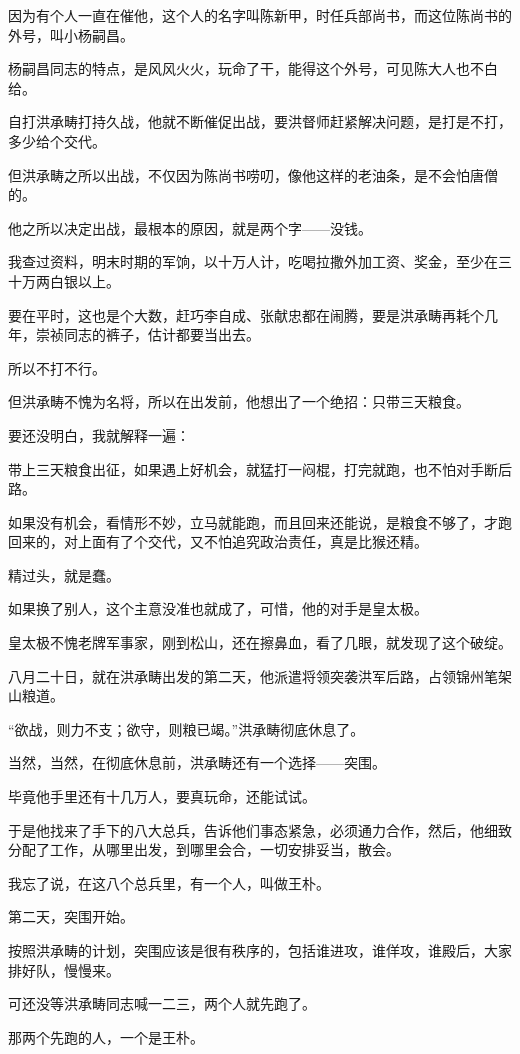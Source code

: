 \begin{multicols}{\theparacolNo}
因为有个人一直在催他，这个人的名字叫陈新甲，时任兵部尚书，而这位陈尚书的外号，叫小杨嗣昌。

杨嗣昌同志的特点，是风风火火，玩命了干，能得这个外号，可见陈大人也不白给。

自打洪承畴打持久战，他就不断催促出战，要洪督师赶紧解决问题，是打是不打，多少给个交代。

但洪承畴之所以出战，不仅因为陈尚书唠叨，像他这样的老油条，是不会怕唐僧的。

他之所以决定出战，最根本的原因，就是两个字——没钱。

我查过资料，明末时期的军饷，以十万人计，吃喝拉撒外加工资、奖金，至少在三十万两白银以上。

要在平时，这也是个大数，赶巧李自成、张献忠都在闹腾，要是洪承畴再耗个几年，崇祯同志的裤子，估计都要当出去。

所以不打不行。

但洪承畴不愧为名将，所以在出发前，他想出了一个绝招：只带三天粮食。

要还没明白，我就解释一遍：

带上三天粮食出征，如果遇上好机会，就猛打一闷棍，打完就跑，也不怕对手断后路。

如果没有机会，看情形不妙，立马就能跑，而且回来还能说，是粮食不够了，才跑回来的，对上面有了个交代，又不怕追究政治责任，真是比猴还精。

精过头，就是蠢。

如果换了别人，这个主意没准也就成了，可惜，他的对手是皇太极。

皇太极不愧老牌军事家，刚到松山，还在擦鼻血，看了几眼，就发现了这个破绽。

八月二十日，就在洪承畴出发的第二天，他派遣将领突袭洪军后路，占领锦州笔架山粮道。

“欲战，则力不支；欲守，则粮已竭。”洪承畴彻底休息了。

当然，当然，在彻底休息前，洪承畴还有一个选择——突围。

毕竟他手里还有十几万人，要真玩命，还能试试。

于是他找来了手下的八大总兵，告诉他们事态紧急，必须通力合作，然后，他细致分配了工作，从哪里出发，到哪里会合，一切安排妥当，散会。

我忘了说，在这八个总兵里，有一个人，叫做王朴。

第二天，突围开始。

按照洪承畴的计划，突围应该是很有秩序的，包括谁进攻，谁佯攻，谁殿后，大家排好队，慢慢来。

可还没等洪承畴同志喊一二三，两个人就先跑了。

那两个先跑的人，一个是王朴。


\end{multicols}

